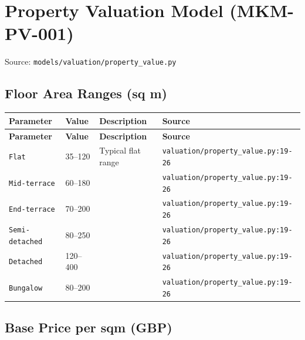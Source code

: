 \documentclass[11pt,a4paper]{article}
\begin{document}
\clearpage

\section{Property Valuation Model (MKM-PV-001)}

Source: \texttt{models/valuation/property\_value.py}

\subsection{Floor Area Ranges (sq m)}

\begin{longtable}{p{4cm}p{4cm}p{5.5cm}p{3.5cm}}
    \toprule
    \textbf{Parameter} & \textbf{Value} & \textbf{Description} & \textbf{Source} \\
    \midrule
    \endfirsthead
    \toprule
    \textbf{Parameter} & \textbf{Value} & \textbf{Description} & \textbf{Source} \\
    \midrule
    \endhead
    \bottomrule
    \endfoot
    \texttt{Flat} & 35--120 & Typical flat range & {\scriptsize \texttt{valuation/property\_value.py:19-26}} \\
    \texttt{Mid-terrace} & 60--180 &  & {\scriptsize \texttt{valuation/property\_value.py:19-26}} \\
    \texttt{End-terrace} & 70--200 &  & {\scriptsize \texttt{valuation/property\_value.py:19-26}} \\
    \texttt{Semi-detached} & 80--250 &  & {\scriptsize \texttt{valuation/property\_value.py:19-26}} \\
    \texttt{Detached} & 120--400 &  & {\scriptsize \texttt{valuation/property\_value.py:19-26}} \\
    \texttt{Bungalow} & 80--200 &  & {\scriptsize \texttt{valuation/property\_value.py:19-26}} \\
\end{longtable}

\subsection{Base Price per sqm (GBP)}
\end{document}
